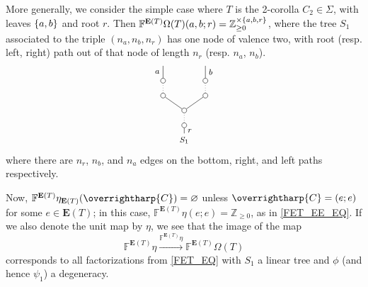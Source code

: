 \documentclass[a4paper,10pt
,draft
]{article}%
\renewcommand{\1}{\eta}%
\newcommand{\vect}[1]{\text{\overrightharp{\ensuremath{#1}}}}
\begin{document}
\begin{example}
      More generally, we consider the simple case where $T$ is the 2-corolla $C_2 \in \Sigma$, with leaves $\left\{a,b\right\}$ and root $r$.
      Then $\mathbb F^{\mathbf E(T)}\Omega(T)(a,b;r) = \mathbb Z_{\geq 0}^{\times \left\{a,b,r\right\}}$,
      where the tree $S_1$ associated to the triple $(n_a, n_b, n_r)$ has one node of valence two,
      with root (resp. left, right) path out of that node of length $n_r$ (resp. $n_a$, $n_b$).
      \[
            \begin{tikzpicture}
                  [grow=up,auto,
                  level distance=2em,
                  every node/.style = {font=\footnotesize,solid},
                  dummy/.style={circle,draw,inner sep=0pt,minimum size=1.75mm},
                  emph/.style={edge from parent/.style={black,thin,dotted,draw}},
                  norm/.style={edge from parent/.style={black,thin,draw,solid}}
                  ]
                  \node {$S_1$}
                  child[norm, level distance=1.5em] {node [dummy] {}
                      child[emph]{node [dummy] {} %
                        child[norm] {node [dummy] {}
                          child[emph] {node [dummy] {}
                            child[norm] {edge from parent node [swap] {$b$}}
                          }
                        }
                         child[norm] {node [dummy] {}
                          child[emph] {node [dummy] {}
                            child[norm] {edge from parent node {$a$}}
                          }
                        }
                      }
                    edge from parent node [swap] {$r$}
                  };
            \end{tikzpicture}
      \]
      where there are $n_r$, $n_b$, and $n_a$ edges on the bottom, right, and left paths respectively.
\end{example}
      
Now, $\mathbb F^{\mathbf E(T)}\eta_{\mathbf E(T)}(\vect C) = \varnothing$ unless $\vect C = (e;e)$ for some $e \in \mathbf E(T)$;
in this case, $\mathbb F^{\mathbf E(T)}\eta(e;e) = \mathbb Z_{\geq 0}$, as in \eqref{FET_EE_EQ}.
% 
If we also denote the unit map by $\eta$, we see that the image of the map
\[
      \mathbb F^{\mathbf E(T)}\eta \xrightarrow{\mathbb F^{\mathbf E(T)}\eta} \mathbb F^{\mathbf E(T)} \Omega(T)
\]
corresponds to all factorizations from \eqref{FET_EQ} with $S_1$ a linear tree and $\phi$ (and hence $\psi_1$) a degeneracy.
\end{document}

